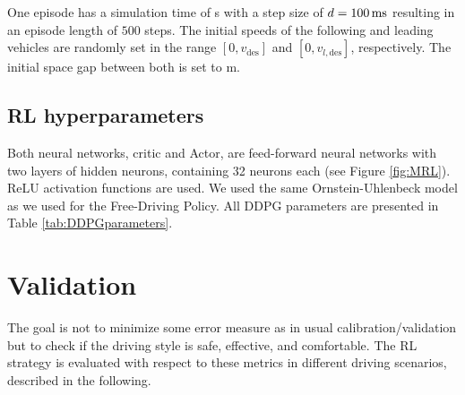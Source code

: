 \documentclass[review]{elsarticle}
\providecommand{\sub}[1]{_{\mathrm{#1}}}  %
\providecommand{\3}{{\ss}}
\begin{document}
One episode has a simulation time of \unit[50]{s} with a step size of
$d=\unit[100]{ms}$ resulting in an episode length of $500$
steps. The initial speeds of the following and leading vehicles are
randomly set in the range $[0,v\sub{des}]$ and $[0,v_{l,\text{des}}]$,
respectively. The initial space gap between both is set to \unit[120]{m}. 

\subsection{RL hyperparameters}
Both neural networks, critic and Actor, are feed-forward neural networks with two layers of hidden neurons, containing 32 neurons each (see Figure \ref{fig:MRL}). ReLU activation functions are used. We used the same Ornstein-Uhlenbeck model as we used for the Free-Driving Policy.
All DDPG parameters are presented in Table \ref{tab:DDPGparameters}.


%








\section{Validation}

The goal is not to minimize some error measure as in usual
calibration/validation but to check if the driving style is safe,
effective, and comfortable. The RL strategy is evaluated with respect to these metrics in different driving scenarios, described in the following.
\end{document}
